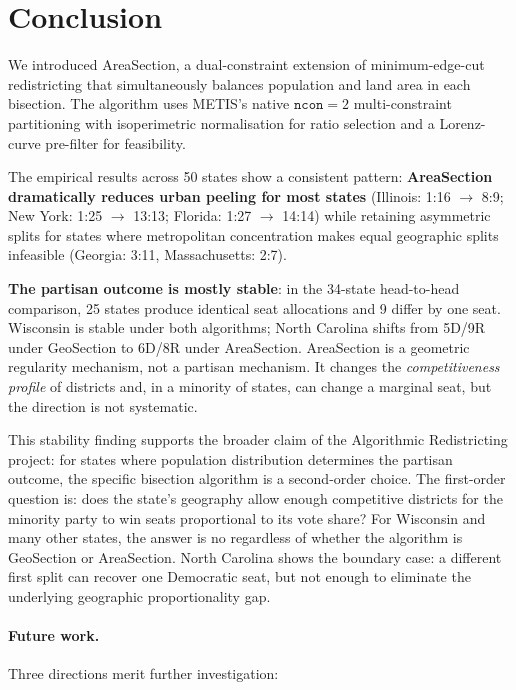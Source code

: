 \section{Conclusion}
\label{sec:conclusion}

We introduced AreaSection, a dual-constraint extension of minimum-edge-cut
redistricting that simultaneously balances population and land area in each
bisection.
The algorithm uses METIS's native $\mathtt{ncon}=2$ multi-constraint
partitioning with isoperimetric normalisation for ratio selection and a
Lorenz-curve pre-filter for feasibility.

The empirical results across 50 states show a consistent pattern:
\textbf{AreaSection dramatically reduces urban peeling for most states}
(Illinois: 1:16 $\to$ 8:9; New York: 1:25 $\to$ 13:13;
Florida: 1:27 $\to$ 14:14) while retaining asymmetric splits for states
where metropolitan concentration makes equal geographic splits infeasible
(Georgia: 3:11, Massachusetts: 2:7).

\textbf{The partisan outcome is mostly stable}: in the 34-state head-to-head
comparison, 25 states produce identical seat allocations and 9 differ by one
seat.
Wisconsin is stable under both algorithms; North Carolina shifts from
5D/9R under GeoSection to 6D/8R under AreaSection.
AreaSection is a geometric regularity mechanism, not a partisan mechanism.
It changes the \emph{competitiveness profile} of districts and, in a minority
of states, can change a marginal seat, but the direction is not systematic.

This stability finding supports the broader claim of the Algorithmic
Redistricting project: for states where population distribution determines
the partisan outcome, the specific bisection algorithm is a second-order
choice.
The first-order question is: does the state's geography allow enough
competitive districts for the minority party to win seats proportional to
its vote share?
For Wisconsin and many other states, the answer is no regardless of whether
the algorithm is GeoSection or AreaSection.
North Carolina shows the boundary case: a different first split can recover
one Democratic seat, but not enough to eliminate the underlying geographic
proportionality gap.

\paragraph{Future work.}
Three directions merit further investigation:

